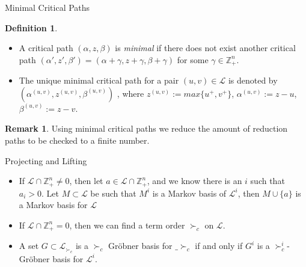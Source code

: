 \documentclass[9pt]{beamer}
\newcommand\Z{\mathbb{Z}}
\theoremstyle{definition}
\newtheorem{remark}{Remark}
\newtheorem{defn}{Definition}
\begin{document}
\begin{frame}[fragile]{Minimal Critical Paths}
  \begin{defn}
    \begin{itemize}
    \item A critical path $(\alpha, z, \beta)$ is \emph{minimal} if there does not
      exist another critical path $(\alpha', z', \beta') = (\alpha + \gamma, z + \gamma, \beta + \gamma)$
      for some $\gamma \in \Z^n_+$.
    \item The unique minimal critical path for a pair $(u, v) \in \mathcal{L}$ is denoted by
      $(\alpha^{(u, v)}, z^{(u,v)}, \beta^{(u,v)})$ , where $z^{(u, v)} := max\{u^+, v^+\}$,
      $\alpha^{(u, v)} := z - u$,       $\beta^{(u, v)} := z - v$.
    \end{itemize}
  \end{defn}
  \begin{remark}
    Using minimal critical paths we reduce the amount of reduction paths to be checked to a finite number.
  \end{remark}
\end{frame}

\begin{frame}[fragile]{Projecting and Lifting}
  \begin{lemma}
    \begin{itemize}
    \item If $\mathcal{L} \cap \Z^n_+ \neq 0$, then let $a \in \mathcal{L} \cap \Z^n_+$,
      and we know there is an $i$ such that $a_i > 0$.
      Let $M \subset \mathcal{L}$ be such that $M^i$ is a Markov basis of
      $\mathcal{L}^i$, then $M \cup \{a\}$ is a Markov basis for $\mathcal{L}$
    \item If $\mathcal{L} \cap \Z^n_+ = 0$, then we can find a term order $\succ_c$ on $\mathcal{L}$.
    \item A set $G \subset \mathcal{L}_{\succ_c}$ is a $\succ_c$ Gr\"obner basis for $\mathcal_{\succ_c}$ if and only if $G^i$ is a $\succ_c^i$-Gr\"obner basis for $\mathcal{L}^i$.
    \end{itemize}
  \end{lemma}
\end{frame}
\end{document}
